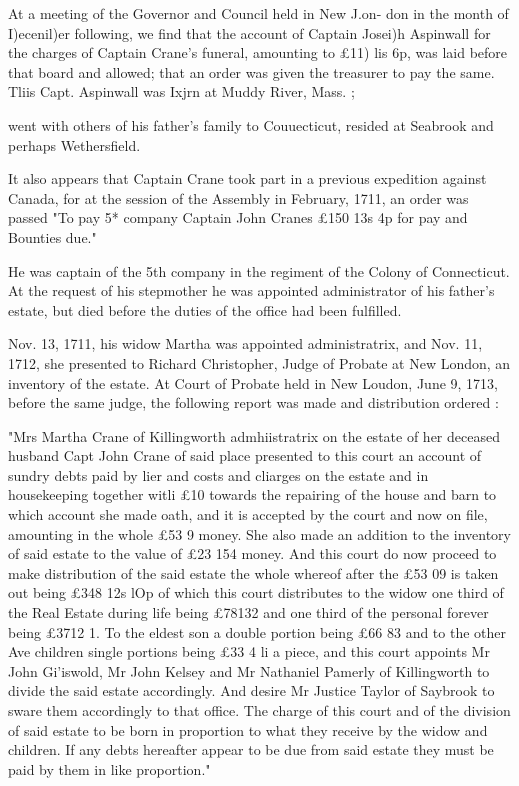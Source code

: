 \documentclass[oneside]{book}
\begin{document}
At a meeting of the Governor and Council held in New J.on- 
don in the month of I)ecenil)er following, we find that the account 
of Captain Josei)h Aspinwall for the charges of Captain Crane's 
funeral, amounting to £11)  lis  6p, was laid before that board 
and allowed; that an order was given the treasurer to pay the 
same. Tliis Capt. Aspinwall was Ixjrn at Muddy River, Mass. ; 




went with others of his father's family to Couuecticut, resided at 
Seabrook and perhaps Wethersfield. 

It also appears that Captain Crane took part in a previous 
expedition against Canada, for at the session of the Assembly in 
February, 1711, an order was passed "To pay 5* company 
Captain John Cranes £150  13s  4p for pay and Bounties due." 

He was captain of the 5th company in the regiment of the 
Colony of Connecticut. At the request of his stepmother he was 
appointed administrator of his father's estate, but died before the 
duties of the office had been fulfilled. 

Nov. 13, 1711, his widow Martha was appointed administratrix, 
and Nov. 11, 1712, she presented to Richard Christopher, Judge 
of Probate at New London, an inventory of the estate. At Court 
of Probate held in New Loudon, June 9, 1713, before the same 
judge, the following report was made and distribution ordered : 

"Mrs Martha Crane of Killingworth admhiistratrix on the estate of 
her deceased husband Capt John Crane of said place presented to this 
court an account of sundry debts paid by lier and costs and cliarges on 
the estate and in housekeeping together witli £10 towards the repairing 
of the house and barn to which account she made oath, and it is accepted 
by the court and now on file, amounting in the whole £53   9 money. 
She also made an addition to the inventory of said estate to the value of 
£23  154 money. And this court do now proceed to make distribution 
of the said estate the whole whereof after the £53  09 is taken out 
being £348  12s  lOp of which this court distributes to the widow one 
third of the Real Estate during life being £78132 and one third of the 
personal forever being £3712  1. To the eldest son a double portion 
being £66  83 and to the other Ave children single portions being 
£33 4 li a piece, and this court appoints Mr John Gi'iswold, Mr John 
Kelsey and Mr Nathaniel Pamerly of Killingworth to divide the said 
estate accordingly. And desire Mr Justice Taylor of Saybrook to sware 
them accordingly to that office. The charge of this court and of the 
division of said estate to be born in proportion to what they receive by 
the widow and children. If any debts hereafter appear to be due from 
said estate they must be paid by them in like proportion." 
\end{document}
